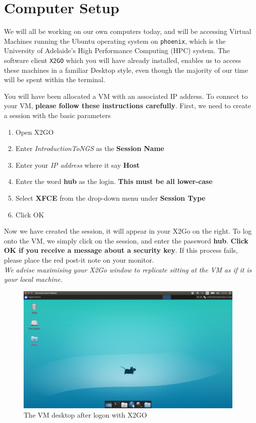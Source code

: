 \section{Computer Setup}
\begin{information}
We will all be working on our own computers today, and will be accessing Virtual Machines running the Ubuntu operating system on \texttt{phoenix}, which is the University of Adelaide's High Performance Computing (HPC) system.
The software client \texttt{X2GO} which you will have already installed, enables us to access these machines in a familiar Desktop style, even though the majority of our time will be spent within the terminal. \\
\end{information}

You will have been allocated a VM with an associated IP address.
To connect to your VM, \textbf{please follow these instructions carefully}.
First, we need to create a session with the basic parameters
\begin{enumerate}
	\item Open X2GO
	\item Enter \textit{IntroductionToNGS} as the \textbf{Session Name}
	\item Enter your \textit{IP address} where it say \textbf{Host}
	\item Enter the word \textbf{hub} as the login. \textbf{This must be all lower-case}
	\item Select \textbf{XFCE} from the drop-down menu under \textbf{Session Type}
	\item Click OK
\end{enumerate}

Now we have created the session, it will appear in your X2Go on the right.
To log onto the VM, we simply click on the session, and enter the password \textbf{hub}.
\textbf{Click OK if you receive a message about a security key}.
If this process fails, please place the red post-it note on your monitor.\\

\textit{We advise maximising your X2Go window to replicate sitting at the VM as if it is your local machine.}

\begin{figure}[ht]
	\centering
	\includegraphics[width=0.9\linewidth]{images/xfceDesktop.png}
	\caption{The VM desktop after logon with X2GO}
\end{figure}


